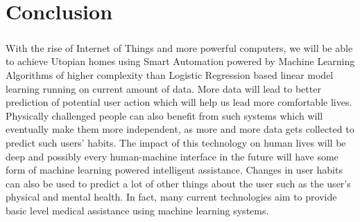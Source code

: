 \chapter{Conclusion}

\paragraph{}
With the rise of Internet of Things and more powerful computers, we will be able to achieve Utopian homes using Smart Automation powered by Machine Learning Algorithms of higher complexity than Logistic Regression based linear model learning running on current amount of data. More data will lead to better prediction of potential user action which will help us lead more comfortable lives. Physically challenged people can also benefit from such systems which will eventually make them more independent, as more and more data gets collected to predict such users' habits. The impact of this technology on human lives will be deep and possibly every human-machine interface in the future will have some form of machine learning powered intelligent assistance. Changes in user habits can also be used to predict a lot of other things about the user such as the user's physical and mental health. In fact, many current technologies aim to provide basic level medical assistance using machine learning systems.